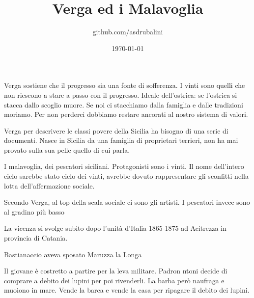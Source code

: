 \documentclass{article}
\title{Verga ed i Malavoglia}
\author{github.com/asdrubalini}
\date{\today}
\begin{document}
    \maketitle

    Verga sostiene che il progresso sia una fonte di sofferenza. I vinti sono quelli che non riescono a stare a passo con il progresso.
    Ideale dell'ostrica: se l'ostrica si stacca dallo scoglio muore. Se noi ci stacchiamo dalla famiglia e dalle tradizioni moriamo. Per non perderci dobbiamo restare ancorati al nostro sistema di valori.

    Verga per descrivere le classi povere della Sicilia ha bisogno di una serie di documenti. Nasce in Sicilia da una famiglia di proprietari terrieri, non ha mai provato sulla sua pelle quello di cui parla.

    I malavoglia, dei pescatori siciliani. Protagonisti sono i vinti. Il nome dell'intero ciclo sarebbe stato ciclo dei vinti, avrebbe dovuto rappresentare gli sconfitti nella lotta dell'affermazione sociale.

    Secondo Verga, al top della scala sociale ci sono gli artisti. I pescatori invece sono al gradino più basso

    La vicenza si svolge subito dopo l'unità d'Italia 1865-1875 ad Acitrezza in provincia di Catania. 

    Bastianaccio aveva sposato Maruzza la Longa

    Il giovane è costretto a partire per la leva militare. Padron ntoni decide di comprare a debito dei lupini per poi rivenderli. La barba però naufraga e muoiono in mare. Vende la barca e vende la casa per ripagare il debito dei lupini.
\end{document}
